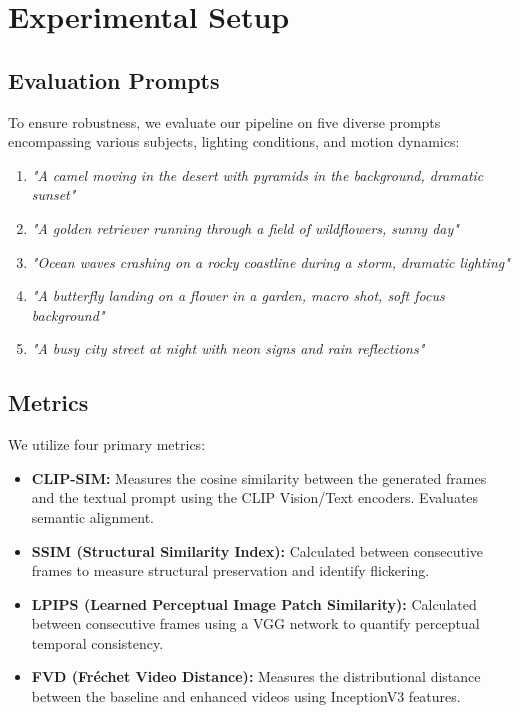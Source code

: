 \documentclass[10pt, conference]{IEEEtran}
\begin{document}
\section{Experimental Setup}

\subsection{Evaluation Prompts}
To ensure robustness, we evaluate our pipeline on five diverse prompts encompassing various subjects, lighting conditions, and motion dynamics:
\begin{enumerate}
    \item \textit{"A camel moving in the desert with pyramids in the background, dramatic sunset"}
    \item \textit{"A golden retriever running through a field of wildflowers, sunny day"}
    \item \textit{"Ocean waves crashing on a rocky coastline during a storm, dramatic lighting"}
    \item \textit{"A butterfly landing on a flower in a garden, macro shot, soft focus background"}
    \item \textit{"A busy city street at night with neon signs and rain reflections"}
\end{enumerate}

\subsection{Metrics}
We utilize four primary metrics:
\begin{itemize}
    \item \textbf{CLIP-SIM:} Measures the cosine similarity between the generated frames and the textual prompt using the CLIP Vision/Text encoders. Evaluates semantic alignment.
    \item \textbf{SSIM (Structural Similarity Index):} Calculated between consecutive frames to measure structural preservation and identify flickering.
    \item \textbf{LPIPS (Learned Perceptual Image Patch Similarity):} Calculated between consecutive frames using a VGG network to quantify perceptual temporal consistency.
    \item \textbf{FVD (Fréchet Video Distance):} Measures the distributional distance between the baseline and enhanced videos using InceptionV3 features.
\end{itemize}
\end{document}
